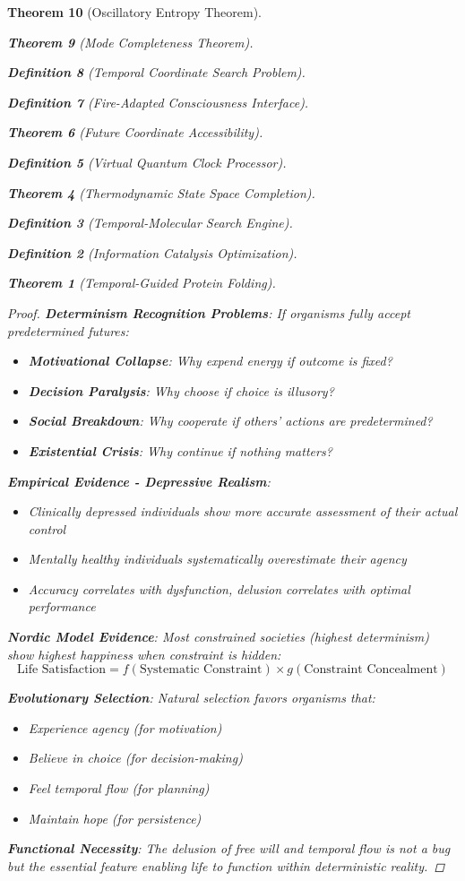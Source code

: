 \documentclass[12pt,a4paper]{article}
\newtheorem{theorem}{Theorem}[section]
\newtheorem{definition}[theorem]{Definition}
\begin{document}
\begin{theorem}[Oscillatory Entropy Theorem]
\begin{theorem}[Mode Completeness Theorem]
\begin{enumerate}
\begin{definition}[Temporal Coordinate Search Problem]
\begin{algorithm}
\begin{definition}[Fire-Adapted Consciousness Interface]
\begin{theorem}[Future Coordinate Accessibility]
\begin{definition}[Virtual Quantum Clock Processor]
\begin{itemize}
\begin{itemize}
\begin{theorem}[Thermodynamic State Space Completion]
\begin{definition}[Temporal-Molecular Search Engine]
\begin{definition}[Information Catalysis Optimization]
\begin{algorithm}
\begin{theorem}[Temporal-Guided Protein Folding]
\begin{table}[h]
\begin{proof}
\textbf{Determinism Recognition Problems}: If organisms fully accept predetermined futures:
\begin{itemize}
    \item \textbf{Motivational Collapse}: Why expend energy if outcome is fixed?
    \item \textbf{Decision Paralysis}: Why choose if choice is illusory?
    \item \textbf{Social Breakdown}: Why cooperate if others' actions are predetermined?
    \item \textbf{Existential Crisis}: Why continue if nothing matters?
\end{itemize}

\textbf{Empirical Evidence - Depressive Realism}:
\begin{itemize}
    \item Clinically depressed individuals show more accurate assessment of their actual control
    \item Mentally healthy individuals systematically overestimate their agency
    \item Accuracy correlates with dysfunction, delusion correlates with optimal performance
\end{itemize}

\textbf{Nordic Model Evidence}: Most constrained societies (highest determinism) show highest happiness when constraint is hidden:
$$\text{Life Satisfaction} = f(\text{Systematic Constraint}) \times g(\text{Constraint Concealment})$$

\textbf{Evolutionary Selection}: Natural selection favors organisms that:
\begin{itemize}
    \item Experience agency (for motivation)
    \item Believe in choice (for decision-making)
    \item Feel temporal flow (for planning)
    \item Maintain hope (for persistence)
\end{itemize}

\textbf{Functional Necessity}: The delusion of free will and temporal flow is not a bug but the essential feature enabling life to function within deterministic reality.


\end{proof}
\end{table}
\end{theorem}
\end{algorithm}
\end{definition}
\end{definition}
\end{theorem}
\end{itemize}
\end{itemize}
\end{definition}
\end{theorem}
\end{definition}
\end{algorithm}
\end{definition}
\end{enumerate}
\end{theorem}
\end{theorem}
\end{document}
